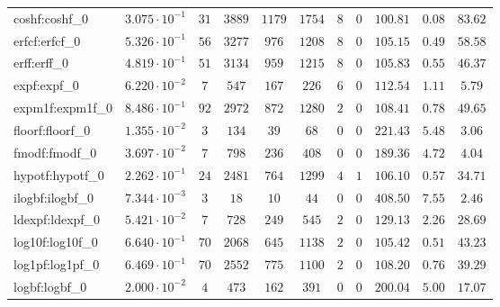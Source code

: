 \begin{tabular}{|l|c|c|c|c|c|c|c|c|c|c|}
coshf:coshf\_0               & $ 3.075 \cdot 10^{-1} $ & $ 31     $ & $ 3889  $ & $ 1179  $ & $ 1754  $ & $ 8   $ & $ 0 $ & $ 100.81      $ & $ 0.08    $ & $ 83.62   $ \\
erfcf:erfcf\_0               & $ 5.326 \cdot 10^{-1} $ & $ 56     $ & $ 3277  $ & $ 976   $ & $ 1208  $ & $ 8   $ & $ 0 $ & $ 105.15      $ & $ 0.49    $ & $ 58.58   $ \\
erff:erff\_0                 & $ 4.819 \cdot 10^{-1} $ & $ 51     $ & $ 3134  $ & $ 959   $ & $ 1215  $ & $ 8   $ & $ 0 $ & $ 105.83      $ & $ 0.55    $ & $ 46.37   $ \\
expf:expf\_0                 & $ 6.220 \cdot 10^{-2} $ & $ 7      $ & $ 547   $ & $ 167   $ & $ 226   $ & $ 6   $ & $ 0 $ & $ 112.54      $ & $ 1.11    $ & $ 5.79    $ \\
expm1f:expm1f\_0             & $ 8.486 \cdot 10^{-1} $ & $ 92     $ & $ 2972  $ & $ 872   $ & $ 1280  $ & $ 2   $ & $ 0 $ & $ 108.41      $ & $ 0.78    $ & $ 49.65   $ \\
floorf:floorf\_0             & $ 1.355 \cdot 10^{-2} $ & $ 3      $ & $ 134   $ & $ 39    $ & $ 68    $ & $ 0   $ & $ 0 $ & $ 221.43      $ & $ 5.48    $ & $ 3.06    $ \\
fmodf:fmodf\_0               & $ 3.697 \cdot 10^{-2} $ & $ 7      $ & $ 798   $ & $ 236   $ & $ 408   $ & $ 0   $ & $ 0 $ & $ 189.36      $ & $ 4.72    $ & $ 4.04    $ \\
hypotf:hypotf\_0             & $ 2.262 \cdot 10^{-1} $ & $ 24     $ & $ 2481  $ & $ 764   $ & $ 1299  $ & $ 4   $ & $ 1 $ & $ 106.10      $ & $ 0.57    $ & $ 34.71   $ \\
ilogbf:ilogbf\_0             & $ 7.344 \cdot 10^{-3} $ & $ 3      $ & $ 18    $ & $ 10    $ & $ 44    $ & $ 0   $ & $ 0 $ & $ 408.50      $ & $ 7.55    $ & $ 2.46    $ \\
ldexpf:ldexpf\_0             & $ 5.421 \cdot 10^{-2} $ & $ 7      $ & $ 728   $ & $ 249   $ & $ 545   $ & $ 2   $ & $ 0 $ & $ 129.13      $ & $ 2.26    $ & $ 28.69   $ \\
log10f:log10f\_0             & $ 6.640 \cdot 10^{-1} $ & $ 70     $ & $ 2068  $ & $ 645   $ & $ 1138  $ & $ 2   $ & $ 0 $ & $ 105.42      $ & $ 0.51    $ & $ 43.23   $ \\
log1pf:log1pf\_0             & $ 6.469 \cdot 10^{-1} $ & $ 70     $ & $ 2552  $ & $ 775   $ & $ 1100  $ & $ 2   $ & $ 0 $ & $ 108.20      $ & $ 0.76    $ & $ 39.29   $ \\
logbf:logbf\_0               & $ 2.000 \cdot 10^{-2} $ & $ 4      $ & $ 473   $ & $ 162   $ & $ 391   $ & $ 0   $ & $ 0 $ & $ 200.04      $ & $ 5.00    $ & $ 17.07   $ \\

\end{tabular}
